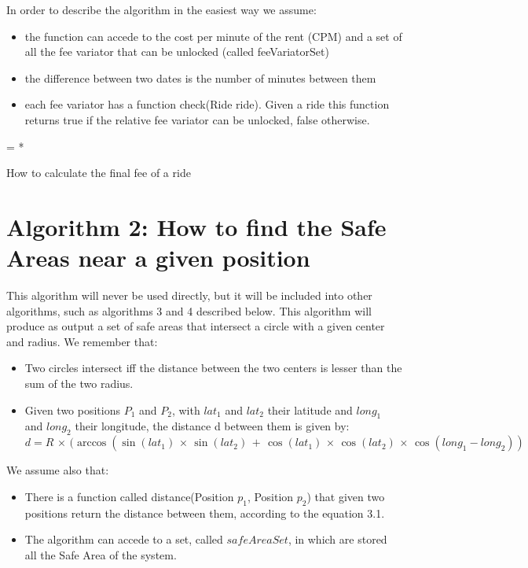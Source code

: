 In order to describe the algorithm in the easiest way we assume:
\begin{itemize}
\item the function can accede to the cost per minute of the rent (CPM) and a set of all the fee variator that can be unlocked (called feeVariatorSet)
\item the difference between two dates is the number of minutes between them
\item each fee variator has a function check(Ride ride). Given a ride this function returns true if the relative fee variator can be unlocked, false otherwise.
\end{itemize}

\begin{algorithm}[H]


	\BlankLine
{}
	\BlankLine
\Res = \RL{\Ride} * \cpm\;
	\BlankLine
{}
\Return \Res \;
\caption{How to calculate the final fee of a ride}
\end{algorithm}

\section{Algorithm 2: How to find the Safe Areas near a given position}
This algorithm will never be used directly, but it will be included into other algorithms, such as algorithms 3 and 4 described below. 
This algorithm will produce as output a set of safe areas that intersect a circle with a given center and radius.
We remember that:
\begin{itemize}
\item Two circles intersect iff the distance between the two centers is lesser than the sum of the two radius.
\item Given two positions $P_{1}$ and $P_{2}$, with $lat_{1}$ and $lat_{2}$ their latitude and $long_{1}$ and $long_{2}$ their longitude, the distance d between them is given by:
\begin{equation}
d = R\,\times\,(\arccos (\sin (lat_{1})\, \times\, \sin (lat_{2})\, +\, \cos (lat_{1})\, \times\, \cos (lat_{2})\, \times\, \cos(long_{1} - long_{2}))
\end{equation}
\end{itemize}
We assume also that:
\begin{itemize}
\item There is a function called distance(Position $p_{1}$, Position $p_{2}$) that given two positions return the distance between them, according to the equation 3.1.
\item The algorithm can accede to a set, called $safeAreaSet$, in which are stored all the Safe Area of the system.
\end{itemize}

